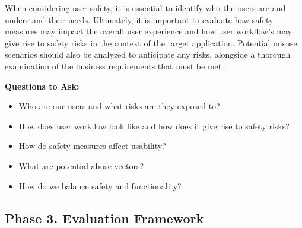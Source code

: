 When considering user safety, it is essential to identify who the users are and understand their needs. Ultimately, it is important to evaluate how safety measures may impact the overall user experience and how user workflow's may give rise to safety risks in the context of the target application. Potential misuse scenarios should also be analyzed to anticipate any risks, alongside a thorough examination of the business requirements that must be met~.

\textbf{Questions to Ask:}
\begin{itemize}
    \item Who are our users and what risks are they exposed to?
    \item How does user workflow look like and how does it give rise to safety risks?
    \item How do safety measures affect usability?
    \item What are potential abuse vectors?
    \item How do we balance safety and functionality?
\end{itemize}

\subsection{Phase 3. Evaluation Framework}

